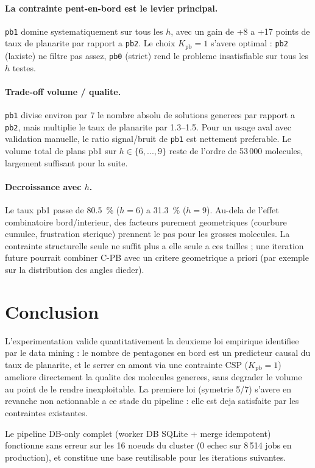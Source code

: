 \documentclass[11pt,a4paper]{article}
\begin{document}
\paragraph{La contrainte pent-en-bord est le levier principal.}
\texttt{pb1} domine systematiquement sur tous les $h$, avec un gain de
+8 a +17 points de taux de planarite par rapport a \texttt{pb2}. Le
choix $K_{\text{pb}} = 1$ s'avere optimal : \texttt{pb2} (laxiste) ne
filtre pas assez, \texttt{pb0} (strict) rend le probleme insatisfiable
sur tous les $h$ testes.

\paragraph{Trade-off volume / qualite.}
\texttt{pb1} divise environ par 7 le nombre absolu de solutions
generees par rapport a \texttt{pb2}, mais multiplie le taux de
planarite par 1.3--1.5. Pour un usage aval avec validation manuelle, le
ratio signal/bruit de \texttt{pb1} est nettement preferable. Le volume
total de plans pb1 sur $h \in \{6,...,9\}$ reste de l'ordre de
53\,000 molecules, largement suffisant pour la suite.

\paragraph{Decroissance avec $h$.}
Le taux pb1 passe de 80.5~\% ($h{=}6$) a 31.3~\% ($h{=}9$). Au-dela de
l'effet combinatoire bord/interieur, des facteurs purement geometriques
(courbure cumulee, frustration sterique) prennent le pas pour les
grosses molecules. La contrainte structurelle seule ne suffit plus a
elle seule a ces tailles ; une iteration future pourrait combiner C-PB
avec un critere geometrique a priori (par exemple sur la distribution
des angles dieder).

\section{Conclusion}

L'experimentation valide quantitativement la deuxieme loi empirique
identifiee par le data mining : le nombre de pentagones en bord est un
predicteur causal du taux de planarite, et le serrer en amont via une
contrainte CSP ($K_{\text{pb}} = 1$) ameliore directement la qualite
des molecules generees, sans degrader le volume au point de le rendre
inexploitable. La premiere loi (symetrie 5/7) s'avere en revanche non
actionnable a ce stade du pipeline : elle est deja satisfaite par les
contraintes existantes.

Le pipeline DB-only complet (worker DB SQLite + merge idempotent)
fonctionne sans erreur sur les 16 noeuds du cluster (0 echec sur
8\,514 jobs en production), et constitue une base reutilisable pour
les iterations suivantes.
\end{document}
